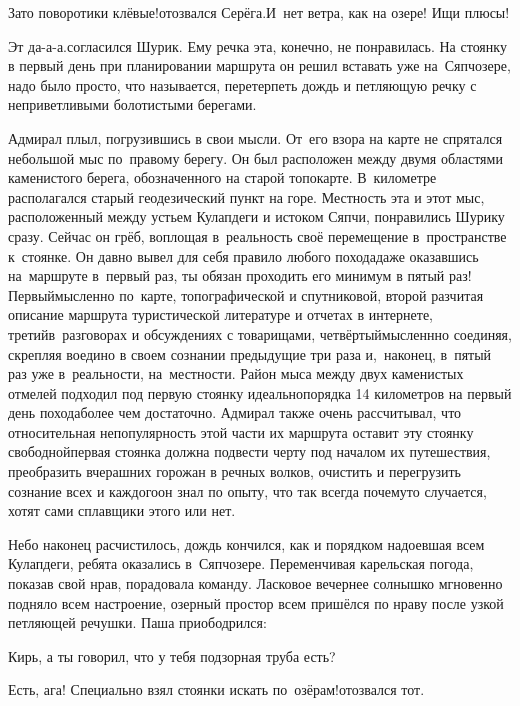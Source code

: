 \diagdash Зато поворотики клёвые!\mdash отозвался Серёга.\mdash И~нет ветра, как на озере! Ищи плюсы!

\diagdash Эт да-а-а.\mdash согласился Шурик. Ему речка эта, конечно, не понравилась. На стоянку в первый день при планировании маршрута  он решил вставать уже на~Сяпчозере, надо было просто, что называется, перетерпеть дождь и петляющую речку с неприветливыми болотистыми берегами. 

Адмирал плыл, погрузившись в свои мысли. От~его взора на карте не спрятался небольшой мыс по~правому берегу. Он был расположен между двумя областями каменистого берега, обозначенного на старой топокарте. В~километре располагался старый геодезический пункт на горе. Местность эта и этот мыс, расположенный между устьем Кулапдеги и истоком Сяпчи, понравились Шурику сразу. Сейчас он грёб, воплощая в~реальность своё перемещение в~пространстве к~стоянке. Он давно вывел для себя правило любого похода\mdash даже оказавшись на~маршруте в~первый раз, ты обязан проходить его минимум в пятый раз! Первый\mdash мысленно по~карте, топографической и спутниковой, второй раз\mdash читая описание маршрута туристической литературе и отчетах в интернете, третий\mdash в~разговорах и обсуждениях с товарищами, четвёртый\mdash мысленнно соединяя, скрепляя воедино в своем сознании предыдущие три раза и,~наконец, в~пятый раз уже в~реальности, на~местности. Район мыса между двух каменистых отмелей подходил под первую стоянку идеально\mdash порядка 14 километров на первый день похода\mdash более чем достаточно. Адмирал также очень рассчитывал, что относительная непопулярность этой части их маршрута оставит эту стоянку свободной\mdash первая стоянка должна подвести черту под началом их путешествия, преобразить вчерашних горожан в речных волков, очистить и перегрузить сознание всех и каждого\mdash он знал по опыту, что так всегда почему\sdash то случается, хотят сами сплавщики этого или нет. 

Небо наконец расчистилось, дождь кончился, как и порядком надоевшая всем Кулапдеги, ребята оказались в~Сяпчозере. Переменчивая карельская погода, показав свой нрав, порадовала команду. Ласковое вечернее солнышко мгновенно подняло всем настроение, озерный простор всем пришёлся по нраву после узкой петляющей речушки. Паша приободрился:

\diagdash Кирь, а ты говорил, что у тебя подзорная труба есть?

\diagdash Есть, ага! Специально взял стоянки искать по~озёрам!\mdash отозвался тот.  


